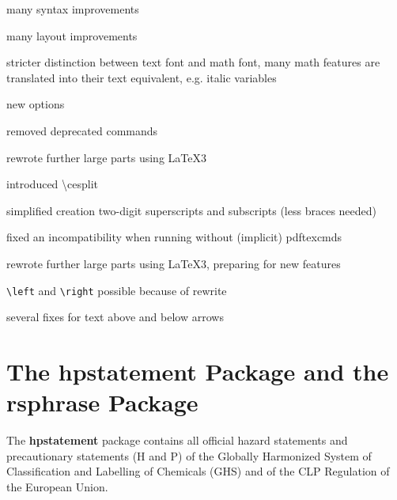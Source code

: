 \documentclass[a4paper,notitlepage,parskip=half]{scrreprt}
\newcommand\macro[1]{{\ttfamily\textbackslash#1}}
\begin{document}
\begin{compactitem}
\item many syntax improvements
\item many layout improvements
\item stricter distinction between text font and math font, many math features are translated into their text equivalent, e.g. italic variables
\item new options
\item removed deprecated commands
\end{compactitem}

\begin{compactitem}
\item rewrote further large parts using \LaTeX3
\item introduced \macro{cesplit}
\item simplified creation two-digit superscripts and subscripts (less braces needed)
\end{compactitem}


\begin{compactitem}
\item fixed an incompatibility when running without (implicit) pdftexcmds
\end{compactitem}

\begin{compactitem}
\item rewrote further large parts using \LaTeX3, preparing for new features
\item \verb|\left| and \verb|\right| possible because of rewrite
\item several fixes for text above and below arrows
\end{compactitem}



\chapter{The hpstatement Package and the rsphrase Package}\label{sec:rsphrase}

The \textbf{hpstatement} package contains all official
hazard statements and precautionary statements (H and P) of the
Globally Harmonized System of Classification and Labelling of Chemicals (GHS)
and of the CLP Regulation of the European Union.
\end{document}
